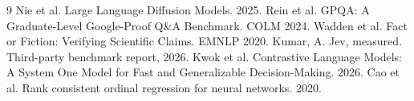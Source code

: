 \documentclass[11pt]{article}
\begin{document}

\begin{thebibliography}{9}
 Nie et al. Large Language Diffusion Models. 2025.
 Rein et al. GPQA: A Graduate-Level Google-Proof Q\&A
Benchmark. COLM 2024.
 Wadden et al. Fact or Fiction: Verifying Scientific
Claims. EMNLP 2020.
 Kumar, A. Jev, measured. Third-party benchmark report, 2026.
 Kwok et al. Contrastive Language Models: A System One Model
for Fast and Generalizable Decision-Making. 2026.
 Cao et al. Rank consistent ordinal regression for
neural networks. 2020.
\end{thebibliography}
\end{document}
